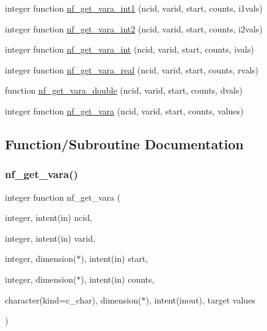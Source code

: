 \begin{DoxyCompactItemize}
\item 
integer function \hyperlink{nf__varaio_8F90_a3d9229b7979dae378c63dff2ac198cf6}{nf\+\_\+get\+\_\+vara\+\_\+int1} (ncid, varid, start, counts, i1vals)
\item 
integer function \hyperlink{nf__varaio_8F90_afcb9640178d83ea181103af7597be73f}{nf\+\_\+get\+\_\+vara\+\_\+int2} (ncid, varid, start, counts, i2vals)
\item 
integer function \hyperlink{nf__varaio_8F90_a84fa4e1adc7b124887866d37516049e3}{nf\+\_\+get\+\_\+vara\+\_\+int} (ncid, varid, start, counts, ivals)
\item 
integer function \hyperlink{nf__varaio_8F90_ad0cf70280990b3ae93c2ee54d2012dd3}{nf\+\_\+get\+\_\+vara\+\_\+real} (ncid, varid, start, counts, rvals)
\item 
function \hyperlink{nf__varaio_8F90_a642bebcbf3a83a4a2dcd251465321ce2}{nf\+\_\+get\+\_\+vara\+\_\+double} (ncid, varid, start, counts, dvals)
\item 
integer function \hyperlink{nf__varaio_8F90_adaa4c4ec0c081e834ab91a8b44f172b6}{nf\+\_\+get\+\_\+vara} (ncid, varid, start, counts, values)
\end{DoxyCompactItemize}


\subsection{Function/\+Subroutine Documentation}
\mbox{\label{nf__varaio_8F90_adaa4c4ec0c081e834ab91a8b44f172b6}} 
\subsubsection{\texorpdfstring{nf\+\_\+get\+\_\+vara()}{nf\_get\_vara()}}
{\footnotesize\ttfamily integer function nf\+\_\+get\+\_\+vara (\begin{DoxyParamCaption}\item[{integer, intent(in)}]{ncid,  }\item[{integer, intent(in)}]{varid,  }\item[{integer, dimension($\ast$), intent(in)}]{start,  }\item[{integer, dimension($\ast$), intent(in)}]{counts,  }\item[{character(kind=c\+\_\+char), dimension($\ast$), intent(inout), target}]{values }\end{DoxyParamCaption})}



